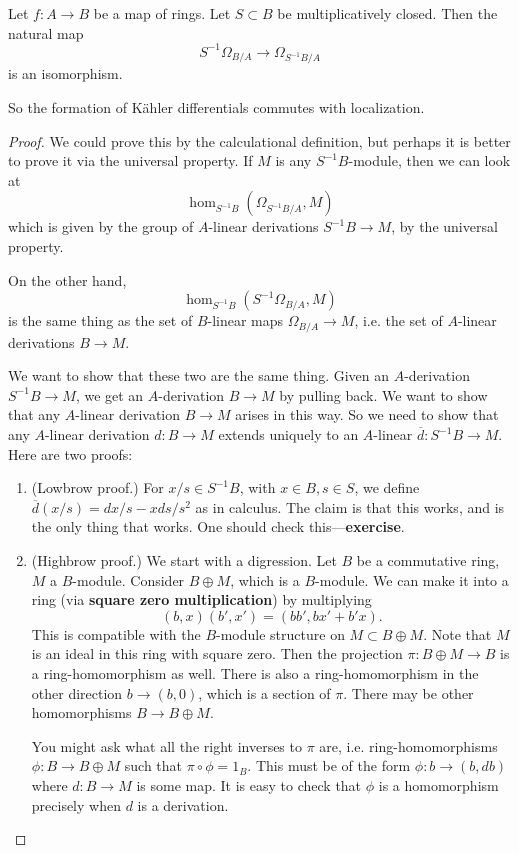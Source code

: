 \begin{proposition} \label{localizationdiff}
Let $f: A \to B$ be a map of rings. Let $S \subset  B$ be multiplicatively
closed. Then the natural map
\[ S^{-1}\Omega_{B/A} \to \Omega_{S^{-1}B/A}  \]
is an isomorphism.
\end{proposition} 
So the formation of K\"ahler differentials commutes with localization.

\begin{proof} 
We could prove this by the calculational definition, but perhaps it is better
to prove it via the universal property. If $M$ is any $S^{-1}B$-module, then 
we can look at 
\[ \hom_{S^{-1}B}( \Omega_{S^{-1}B/A}, M)  \]
which is given by the group of $A$-linear derivations $S^{-1}B \to M$, by the
universal property. 

On the other hand, 
\[ \hom_{S^{-1}B}( S^{-1} \Omega_{B/A}, M)  \]
is the same thing as the set of $B$-linear maps $\Omega_{B/A} \to M$, i.e. the
set of $A$-linear derivations $B \to M$. 

We want to show that these two are the same thing. Given an $A$-derivation
$S^{-1}B \to M$, we get an $A$-derivation $B \to M$ by pulling back. We want to
show that any $A$-linear derivation $B \to M$ arises in this way. So we need to
show that any $A$-linear derivation $d: B \to M$ extends uniquely to an $A$-linear
$\overline{d}: S^{-1}B \to M$.
Here are two proofs:
\begin{enumerate}
\item (Lowbrow proof.) For $x/s \in S^{-1}B$, with $x \in B, s \in S$, we
define $\overline{d}(x/s) = dx/s - xds/s^2$ as in calculus. The claim is that
this works, and is the only thing that works. One should check
this---\textbf{exercise}.
\item (Highbrow proof.) We start with a digression. Let $B$ be a commutative
ring, $M$ a $B$-module. Consider $B \oplus M$, which is a  $B$-module. We can
make it into a ring (via \textbf{square zero multiplication}) by multiplying
\[ (b,x)(b',x') = (bb', bx'+b'x).  \]
This is compatible with the $B$-module structure on $M \subset B \oplus
M$. Note that $M$ is an ideal in this ring with square zero.  Then the
projection $\pi: B \oplus M \to B$ is a ring-homomorphism as well.
There is also a ring-homomorphism in the other direction $b \to (b,0)$, which
is a section of $\pi$. There may be other homomorphisms $B \to B \oplus M$.

You might ask what all the right inverses to $\pi$ are, i.e. ring-homomorphisms
$\phi:  B \to B \oplus M $ such that $\pi \circ \phi = 1_{B}$. This must be of
the form $\phi: b \to (b, db)$ where $d: B \to M$ is some map. It is easy to check
that $\phi$ is a homomorphism precisely when $d$ is a derivation.


\end{enumerate}
\end{proof}
